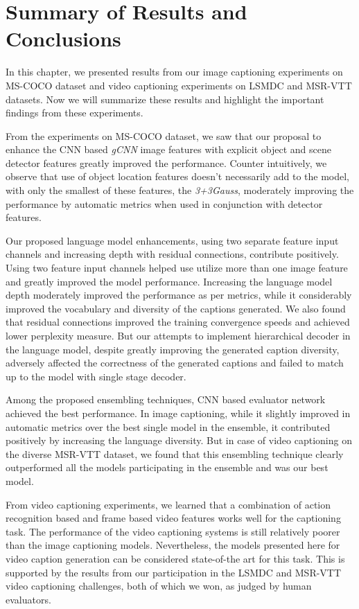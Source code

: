 \section{Summary of Results and Conclusions}
In this chapter, we presented results from our image captioning experiments on
MS-COCO dataset and video captioning experiments on LSMDC and MSR-VTT datasets.
Now we will summarize these results and highlight the important findings from
these experiments.

From the experiments on MS-COCO dataset, we saw that our proposal to enhance the
CNN based \emph{gCNN} image features with explicit object and scene detector
features greatly improved the performance. 
Counter intuitively, we observe that use of object location features doesn't
necessarily add to the model, with only the smallest of these features, the
\emph{3+3Gauss}, moderately improving the performance by automatic metrics when
used in conjunction with detector features.

Our proposed language model enhancements, using two separate feature input
channels and increasing depth with residual connections, contribute positively.
Using two feature input channels helped use utilize more than one image feature
and greatly improved the model performance.
Increasing the language model depth moderately improved the performance as per
metrics, while it considerably improved the vocabulary and diversity of the
captions generated.
We also found that residual connections improved the training convergence
speeds and achieved lower perplexity measure.
But our attempts to implement hierarchical decoder in the language model,
despite greatly improving the generated caption diversity, adversely affected
the correctness of the generated captions and failed to match up to the model
with single stage decoder.

Among the proposed ensembling techniques, CNN based evaluator network achieved
the best performance.
In image captioning, while it slightly improved in automatic metrics over the
best single model in the ensemble, it contributed positively by increasing the
language diversity. 
But in case of video captioning on the diverse MSR-VTT dataset, we found that
this ensembling technique clearly outperformed all the models participating in
the ensemble and was our best model.

From video captioning experiments, we learned that a combination of action
recognition based and frame based video features works well for the captioning
task.
The performance of the video captioning systems is still relatively poorer than
the image captioning models.
Nevertheless, the models presented here for video caption generation can be
considered state-of-the art for this task.
This is supported by the results from our participation in the LSMDC and MSR-VTT
video captioning challenges, both of which we won, as judged by human
evaluators.

